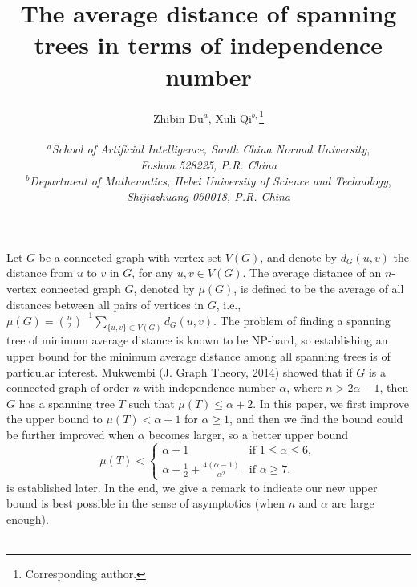 \documentclass[12pt]{article}
\begin{document}
\title{The average distance of spanning trees in terms of independence number}

\author{Zhibin Du$^{a}$, Xuli Qi$^{b,}$\footnote{Corresponding author.}\\
\vspace{1mm}\\
$^a${\it School of Artificial Intelligence, South China Normal University}, \\
{\it Foshan 528225, P.R. China} \\
$^b${\it Department of Mathematics, Hebei University of Science and Technology}, \\
{\it Shijiazhuang 050018, P.R. China}
}


\date{}
\maketitle

\makeatletter

\def\@makefnmark{}

\makeatother









Let $G$ be a connected graph with vertex set $V(G)$, and denote by $d_G(u,v)$ the distance from $u$ to $v$ in $G$, for any $u,v \in V(G)$.
The average distance of an $n$-vertex connected graph $G$, denoted by $\mu(G)$, is defined to be the average of all distances between all pairs of vertices in $G$, i.e.,
$\mu (G) = \binom{n}{2}^{-1} \sum_{\{u,v\} \subset V(G)}d_G(u,v)$.
The problem of
finding a spanning tree of minimum average distance is known to be
NP-hard, so establishing an upper bound for the minimum average distance among all spanning trees is of particular interest. Mukwembi (J. Graph Theory, 2014) showed that if $G$ is a connected graph of order $n$ with independence number $\alpha$, where $n > 2 \alpha - 1$, then $G$ has a spanning tree $T$ such that $\mu(T) \le \alpha + 2$.
In this paper, we first improve the upper bound to $\mu(T) < \alpha + 1$ for $\alpha \ge 1$, and then we find the bound could be further improved when $\alpha$ becomes larger, so a better upper bound
$$
\renewcommand{\arraystretch}{1.2}
\mu(T) < \left\{\begin{array}{ll}
\alpha + 1  & \mbox{if $1 \le \alpha \le 6$},\\
 \alpha + \frac{1}{2} + \frac{4(\alpha-1)}{\alpha^2}
 & \mbox{if $\alpha \ge 7$},
\end{array}
\right.
$$
is established later. In the end, we give a remark to indicate our new upper bound is best possible in the sense of asymptotics (when $n$ and $\alpha$ are large enough).
\\ \\
\end{document}
